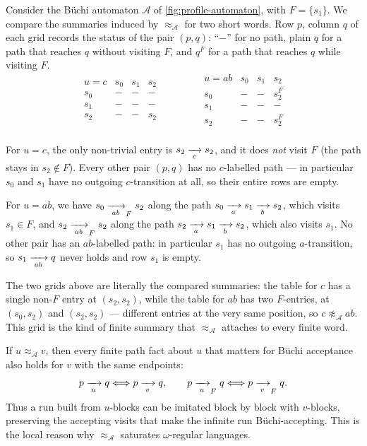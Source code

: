 \begin{example}
\label{ex:profile-table}
Consider the B\"uchi automaton $\mathcal A$ of \cref{fig:profile-automaton}, with
$F=\{s_1\}$.  We compare the summaries induced by
$\approx_{\mathcal A}$ for two short words.  Row $p$, column $q$ of
each grid records the status of the pair $(p,q)$: ``$-$'' for no path,
plain $q$ for a path that reaches $q$ without visiting $F$, and $q^F$
for a path that reaches $q$ while visiting $F$.
\[
\begin{array}{c|ccc}
  u=c  & s_0 & s_1 & s_2 \\ \hline
  s_0  & -   & -   & -   \\
  s_1  & -   & -   & -   \\
  s_2  & -   & -   & s_2 \\
\end{array}
\qquad\qquad
\begin{array}{c|ccc}
  u=ab & s_0 & s_1 & s_2   \\ \hline
  s_0  & -   & -   & s_2^F \\
  s_1  & -   & -   & -     \\
  s_2  & -   & -   & s_2^F \\
\end{array}
\]

For $u=c$, the only non-trivial entry is
$s_2\xrightarrow[{\;c\;}]{}s_2$, and it does \emph{not} visit $F$ (the path
stays in $s_2\notin F$).  Every other pair $(p,q)$ has no $c$-labelled
path --- in particular $s_0$ and $s_1$ have no outgoing $c$-transition
at all, so their entire rows are empty.

For $u=ab$, we have $s_0\xrightarrow[{\;ab\;}]{}_{F}s_2$ along the path
$s_0\xrightarrow[{\;a\;}]{}s_1\xrightarrow[{\;b\;}]{}s_2$, which visits $s_1\in F$, and
$s_2\xrightarrow[{\;ab\;}]{}_{F}s_2$ along the path
$s_2\xrightarrow[{\;a\;}]{}s_1\xrightarrow[{\;b\;}]{}s_2$, which also visits $s_1$.  No
other pair has an $ab$-labelled path: in particular $s_1$ has no
outgoing $a$-transition, so $s_1\xrightarrow[{\;ab\;}]{}q$ never holds and row $s_1$ is
empty.

The two grids above are literally the compared summaries: the table for
$c$ has a single non-$F$ entry at $(s_2,s_2)$, while the table for $ab$
has two $F$-entries, at $(s_0,s_2)$ and $(s_2,s_2)$ --- different
entries at the very same position, so $c\not\approx_{\mathcal A}ab$.
This grid is the kind of finite summary that $\approx_{\mathcal A}$
attaches to every finite word.
\end{example}

\begin{formaldetails}
If $u\approx_{\mathcal A} v$, then every finite path fact about $u$ that matters
for B\"uchi acceptance also holds for $v$ with the same endpoints:
\[
  p\xrightarrow[{\;u\;}]{}q \Longleftrightarrow p\xrightarrow[{\;v\;}]{}q,
  \qquad
  p\xrightarrow[{\;u\;}]{}_{F}q \Longleftrightarrow p\xrightarrow[{\;v\;}]{}_{F}q.
\]
Thus a run built from $u$-blocks can be imitated block by block with
$v$-blocks, preserving the accepting visits that make the infinite run
B\"uchi-accepting.  This is the local reason why
$\approx_{\mathcal A}$ saturates $\omega$-regular languages.
\end{formaldetails}

